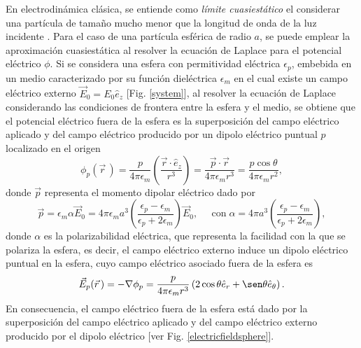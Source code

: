 En electrodinámica clásica, se entiende como \textit{límite cuasiestático} el considerar una partícula de tamaño mucho menor que la longitud de onda de la luz incidente \cite{Cuasiestatico}. Para el caso de una partícula esférica de radio $a$, se puede emplear la aproximación cuasiestática al resolver la ecuación de Laplace para el potencial eléctrico $\phi$. Si se considera una esfera con permitividad eléctrica $\epsilon_p$, embebida en un medio caracterizado por su función dieléctrica $\epsilon_m$ en el cual existe un campo eléctrico externo $\Vec{E}_0=E_0\hat{e}_z$ [Fig. \ref{system}], al resolver la ecuación de Laplace considerando las condiciones de frontera entre la esfera y el medio, se obtiene que el potencial eléctrico fuera de la esfera es la superposición del campo eléctrico aplicado y del campo eléctrico producido por un dipolo eléctrico puntual $p$ localizado en el origen \cite{Griffiths}
\begin{equation}
	\phi_p(\vec{r}\,)=\frac{p}{4\pi\epsilon_m}\left(\frac{\Vec{r}\cdot\hat{e}_z}{r^3}\right)=\frac{\Vec{p}\cdot\Vec{r}}{4\pi\epsilon_m r^3}=\frac{p\cos\theta}{4\pi\epsilon_m r^2},
	\label{pot_dipolo}
\end{equation}
donde $\Vec{p}$ representa el momento dipolar eléctrico dado por \cite{Bohren}
\begin{equation*}
	\vec{p}= \epsilon_m\alpha\Vec{E}_0=4\pi\epsilon_m a^3\left(\frac{\epsilon_p-\epsilon_m}{\epsilon_p+2\epsilon_m}\right)\Vec{E}_0, \;\:\:\:\:\: \text{con}\; \alpha=4\pi a^3\left(\frac{\epsilon_p-\epsilon_m}{\epsilon_p+2\epsilon_m}\right), 
	\label{momentdipol}
\end{equation*}
donde $\alpha$ es la polarizabilidad eléctrica, que representa la facilidad con la que se polariza la esfera, es decir, el campo eléctrico externo induce un dipolo eléctrico puntual en la esfera, cuyo campo eléctrico asociado fuera de la esfera es 
\begin{equation*}
	\Vec{E}_p(\vec{r}\,)=-\nabla \phi_p =\frac{p}{4\pi \epsilon_m r^3 }\left(2\cos\theta\hat{e}_r+\sen\theta\hat{e}_{\theta}\right).
\end{equation*}
En consecuencia, el campo eléctrico fuera de la esfera está dado por la superposición del campo eléctrico aplicado y del campo eléctrico externo producido por el dipolo eléctrico [ver Fig. \ref{electricfieldsphere}].


